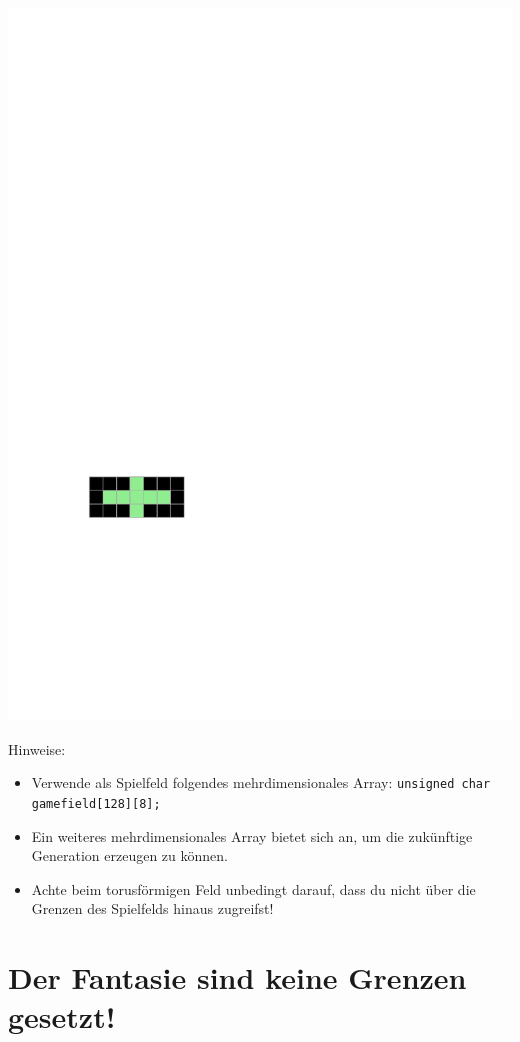\begin{center}
\includegraphics[scale=1]{gol_init3}
\end{center}
Hinweise:
\begin{itemize}
\item Verwende als Spielfeld folgendes mehrdimensionales Array:
\texttt{unsigned char gamefield[128][8];}
\item Ein weiteres mehrdimensionales Array bietet sich an, um die zukünftige Generation erzeugen zu können.
\item Achte beim torusförmigen Feld unbedingt darauf, dass du nicht über die Grenzen des Spielfelds hinaus zugreifst!
\end{itemize}

\section{Der Fantasie sind keine Grenzen gesetzt!}

